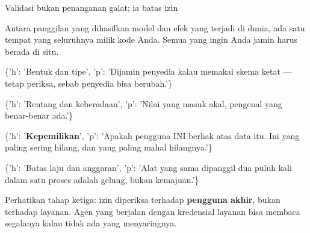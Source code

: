 \documentclass[aspectratio=169,11pt,t]{beamer}
\begin{document}
\begin{frame}[shrink=25]{Validasi bukan penanganan galat; ia batas izin}
{\fontsize{9.4}{12.6}\selectfont\color{fg2}Antara panggilan yang dihasilkan model dan efek yang terjadi di dunia, ada satu tempat yang seluruhnya milik kode Anda. Semua yang ingin Anda jamin harus berada di situ.\par}\vskip 4pt
\begin{isteps}
\item \{'h': 'Bentuk dan tipe', 'p': 'Dijamin penyedia kalau memakai skema ketat --- tetap periksa, sebab penyedia bisa berubah.'\}
\item \{'h': 'Rentang dan keberadaan', 'p': 'Nilai yang masuk akal, pengenal yang benar-benar ada.'\}
\item \{'h': '\textbf{Kepemilikan}', 'p': 'Apakah pengguna INI berhak atas data itu. Ini yang paling sering hilang, dan yang paling mahal hilangnya.'\}
\item \{'h': 'Batas laju dan anggaran', 'p': 'Alat yang sama dipanggil dua puluh kali dalam satu proses adalah gelung, bukan kemajuan.'\}
\end{isteps}
\begin{iband}[signal]
Perhatikan tahap ketiga: izin diperiksa terhadap \textbf{pengguna akhir}, bukan terhadap layanan. Agen yang berjalan dengan kredensial layanan bisa membaca segalanya kalau tidak ada yang menyaringnya.
\end{iband}
\end{frame}
\end{document}
